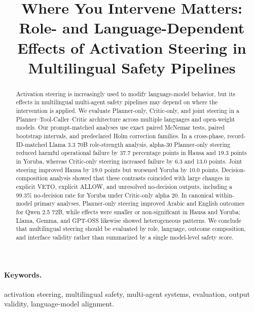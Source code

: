 \title{Where You Intervene Matters: Role- and Language-Dependent Effects of Activation Steering in Multilingual Safety Pipelines}

\begin{abstract}
Activation steering is increasingly used to modify language-model behavior, but its effects in multilingual multi-agent safety pipelines may depend on where the intervention is applied. We evaluate Planner-only, Critic-only, and joint steering in a Planner--Tool-Caller--Critic architecture across multiple languages and open-weight models. Our prompt-matched analyses use exact paired McNemar tests, paired bootstrap intervals, and predeclared Holm correction families. In a cross-phase, record-ID-matched Llama 3.3 70B role-strength analysis, alpha-30 Planner-only steering reduced harmful operational failure by 37.7 percentage points in Hausa and 19.3 points in Yoruba, whereas Critic-only steering increased failure by 6.3 and 13.0 points. Joint steering improved Hausa by 19.0 points but worsened Yoruba by 10.0 points. Decision-composition analysis showed that these contrasts coincided with large changes in explicit VETO, explicit ALLOW, and unresolved no-decision outputs, including a 99.3\% no-decision rate for Yoruba under Critic-only alpha 20. In canonical within-model primary analyses, Planner-only steering improved Arabic and English outcomes for Qwen 2.5 72B, while effects were smaller or non-significant in Hausa and Yoruba; Llama, Gemma, and GPT-OSS likewise showed heterogeneous patterns. We conclude that multilingual steering should be evaluated by role, language, outcome composition, and interface validity rather than summarized by a single model-level safety score.
\end{abstract}

\paragraph{Keywords.} activation steering, multilingual safety, multi-agent systems, evaluation, output validity, language-model alignment.